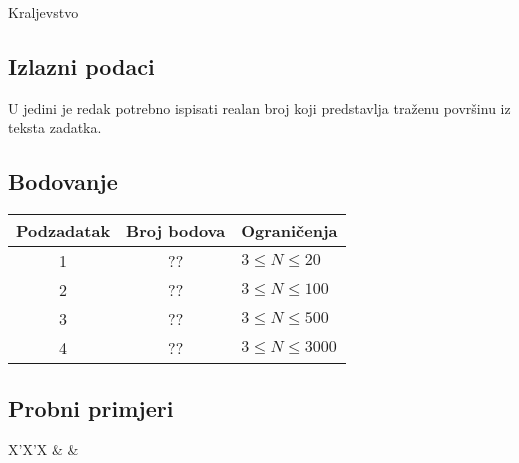 \begin{statement}[
  problempoints=100,
  timelimit=1 sekunda,
  memorylimit=512 MiB,
]{Kraljevstvo}
\subsection*{Izlazni podaci}
U jedini je redak potrebno ispisati realan broj koji predstavlja traženu
površinu iz teksta zadatka.

\subsection*{Bodovanje}
{\renewcommand{\arraystretch}{1.4}
  \setlength{\tabcolsep}{6pt}
  \begin{tabular}{ccl}
 Podzadatak & Broj bodova & Ograničenja \\ \midrule
  1 & ?? & $3 \le N \le 20$ \\
  2 & ?? & $3 \le N \le 100$ \\
  3 & ?? & $3 \le N \le 500$ \\
  4 & ?? & $3 \le N \le 3000$ \\
\end{tabular}}

\subsection*{Probni primjeri}
\begin{tabularx}{\textwidth}{X'X'X}
 &
 &
\end{tabularx}


\end{statement}

